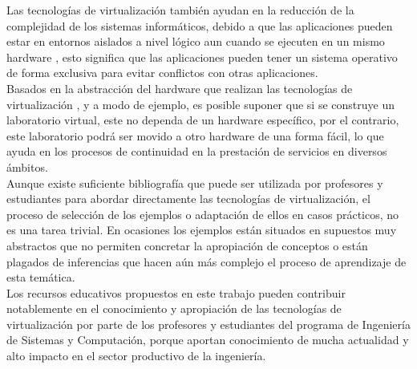 Las tecnologías de virtualización también ayudan en la reducción de la complejidad de los sistemas informáticos, debido a que las aplicaciones pueden estar en entornos aislados a nivel lógico aun cuando se ejecuten en un mismo hardware \parencite{Chiueh2005}, esto significa que las aplicaciones pueden tener un sistema operativo de forma exclusiva para evitar conflictos con otras aplicaciones. \\

Basados en la abstracción del hardware que realizan las tecnologías de virtualización \parencite{Chiueh2005}, y a modo de ejemplo, es posible suponer que si se construye un laboratorio virtual, este no dependa de un hardware específico, por el contrario, este laboratorio podrá ser movido a otro hardware de una forma fácil, lo que ayuda en los procesos de continuidad en la prestación de servicios en diversos ámbitos. \\

Aunque existe suficiente bibliografía que puede ser utilizada por profesores y estudiantes para abordar directamente las tecnologías de virtualización, el proceso de selección de los ejemplos o adaptación de ellos en casos prácticos, no es una tarea trivial. En ocasiones los ejemplos están situados en supuestos muy abstractos que no permiten concretar la apropiación de conceptos o están plagados de inferencias que hacen aún más complejo el proceso de aprendizaje de esta temática. \\

Los recursos educativos propuestos en este trabajo pueden contribuir notablemente en el conocimiento y apropiación de las tecnologías de virtualización por parte de los profesores y estudiantes del programa de Ingeniería de Sistemas y Computación, porque aportan conocimiento de mucha actualidad y alto impacto en el sector productivo de la ingeniería.

